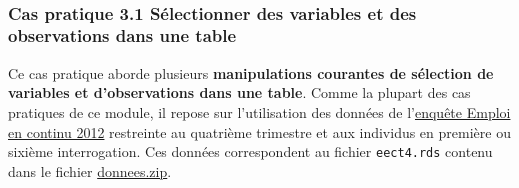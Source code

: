 \documentclass[12pt,twosided, notitlepage]{book}
\begin{document}
~

\subsubsection{\texorpdfstring{\textbf{Cas pratique 3.1} Sélectionner
des variables et des observations dans une
table}{Cas pratique 3.1 Sélectionner des variables et des observations dans une table}}\label{cas-pratique-3.1-selectionner-des-variables-et-des-observations-dans-une-table}


Ce cas pratique aborde plusieurs \textbf{manipulations courantes de
sélection de variables et d'observations dans une table}. Comme la
plupart des cas pratiques de ce module, il repose sur l'utilisation des
données de
l'\href{https://www.insee.fr/fr/metadonnees/source/s1223}{enquête Emploi
en continu 2012} restreinte au quatrième trimestre et aux individus en
première ou sixième interrogation. Ces données correspondent au fichier
\texttt{eect4.rds} contenu dans le fichier
\href{http://r.slmc.fr/donnees.zip}{donnees.zip}.
\end{document}
